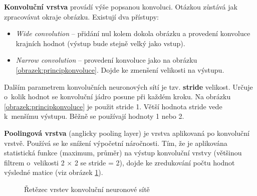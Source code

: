 \textbf{Konvoluční vrstva} provádí výše popsanou konvoluci. Otázkou zůstává jak zpracovávat okraje obrázku. Existují dva přístupy:

\begin{itemize}
  \item \emph{Wide convolution} -- přidání nul kolem dokola obrázku a provedení konvoluce krajních hodnot (výstup bude stejně velký jako vstup).
  \item \emph{Narrow convolution} -- provedení konvoluce jako na obrázku \ref{obrazek:principkonvoluce}. Dojde ke zmenšení velikosti na výstupu.
\end{itemize}

Dalším parametrem konvolučních neuronových sítí je tzv. \textbf{stride} velikost. Určuje o~kolik hodnot se konvoluční jádro posune při každém kroku. Na obrázku \ref{obrazek:principkonvoluce} je použit stride 1. Větší hodnota stride vede k~menšímu výstupu. Běžně se používají hodnoty 1 nebo 2.

\textbf{Poolingová vrstva} (anglicky pooling layer) je vrstva aplikovaná po konvoluční vrstvě. Používá se ke snížení výpočetní náročnosti. Tím, že je aplikována statistická funkce (maximum, průměr) na výstup konvoluční vrstvy (většinou filtrem o~velikosti 2 $\times$ 2 se stride = 2), dojde ke zredukování počtu hodnot výsledné matice (viz obrázek \ref{obrazek:cnnpooling}).

\begin{figure}[H]
  \begin{center}
  \label{obrazek:cnnpooling}
  \caption{Řetězec vrstev konvoluční neuronové sítě \cite{cnnCv}}
  \end{center}
\end{figure}

